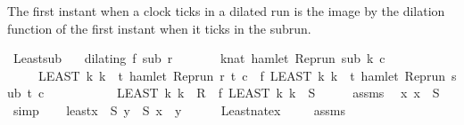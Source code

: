\begin{isabellebody}
%
\begin{isamarkuptext}%
The first instant when a clock ticks in a dilated run is the image by the dilation
  function of the first instant when it ticks in the subrun.%
\end{isamarkuptext}\isamarkuptrue%
\isamarkupfalse%
\ Least{\isacharunderscore}sub{\isacharcolon}\isanewline
\ \ \ {\isacartoucheopen}dilating\ f\ sub\ r{\isacartoucheclose}\isanewline
\ \ \ \ \ \ \ {\isacartoucheopen}{\isasymexists}k{\isacharcolon}{\isacharcolon}nat{\isachardot}\ hamlet\ {\isacharparenleft}{\isacharparenleft}Rep{\isacharunderscore}run\ sub{\isacharparenright}\ k\ c{\isacharparenright}{\isacartoucheclose}\isanewline
\ \ \ \ \ {\isacartoucheopen}{\isacharparenleft}LEAST\ k{\isachardot}\ k\ {\isasymin}\ {\isacharbraceleft}t{\isachardot}\ hamlet\ {\isacharparenleft}{\isacharparenleft}Rep{\isacharunderscore}run\ r{\isacharparenright}\ t\ c{\isacharparenright}{\isacharbraceright}{\isacharparenright}\ {\isacharequal}\ f\ {\isacharparenleft}LEAST\ k{\isachardot}\ k\ {\isasymin}\ {\isacharbraceleft}t{\isachardot}\ hamlet\ {\isacharparenleft}{\isacharparenleft}Rep{\isacharunderscore}run\ sub{\isacharparenright}\ t\ c{\isacharparenright}{\isacharbraceright}{\isacharparenright}{\isacartoucheclose}\isanewline
\ \ \ \ \ \ \ \ \ \ {\isacharparenleft}\ {\isacartoucheopen}{\isacharparenleft}LEAST\ k{\isachardot}\ k\ {\isasymin}\ {\isacharquery}R{\isacharparenright}\ {\isacharequal}\ f\ {\isacharparenleft}LEAST\ k{\isachardot}\ k\ {\isasymin}\ {\isacharquery}S{\isacharparenright}{\isacartoucheclose}{\isacharparenright}\isanewline
%
\isadelimproof
%
\endisadelimproof
%
\isatagproof
{}\isamarkupfalse%
\ {\isacharminus}\isanewline
\ \ \isamarkupfalse%
\ assms{\isacharparenleft}{}{\isacharparenright}\ \isamarkupfalse%
\ {\isacartoucheopen}{\isasymexists}x{\isachardot}\ x\ {\isasymin}\ {\isacharquery}S{\isacartoucheclose}\ \isamarkupfalse%
\ simp\isanewline
\ \ \isamarkupfalse%
\ least{\isacharcolon}{\isacartoucheopen}{\isasymexists}x\ {\isasymin}\ {\isacharquery}S{\isachardot}\ {\isasymforall}y\ {\isasymin}\ {\isacharquery}S{\isachardot}\ x\ {\isasymle}\ y{\isacartoucheclose}\isanewline
\ \ \ \ \isamarkupfalse%
\ Least{\isacharunderscore}nat{\isacharunderscore}ex\ \isacommand{{\isachardot}{\isachardot}}\isamarkupfalse%
\isanewline
\ \ \isamarkupfalse%
\ assms{\isacharparenleft}{}{\isacharparenright}\ \isamarkupfalse%

\end{isabellebody}
